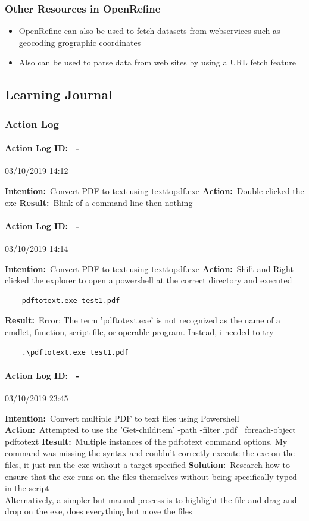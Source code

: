 \documentclass[12pt]{article}
\newcounter{problem} \setcounter{problem}{1}
\newcommand{\actionlog}[1]{\paragraph{Action Log ID: \theproblem\ -}{#1} ~\\ \addtocounter{problem}{1}}
\newcommand{\intention}[1]{\textbf{Intention:}{\textnormal\ #1} \newline}
\newcommand{\action}[1]{\textbf{Action:}{\textnormal\ #1} \newline}
\newcommand{\result}[1]{\textbf{Result:}{\textnormal\ #1} \newline}
\newcommand{\solution}[1]{\textbf{Solution:}{\textnormal\ #1} \newline}
\begin{document}
\subsubsection{Other Resources in OpenRefine}
\begin{itemize}
    \item OpenRefine can also be used to fetch datasets from webservices such as geocoding grographic coordinates
    \item Also can be used to parse data from web sites by using a URL fetch feature
\end{itemize}

\subsection{Learning Journal}

\subsubsection{Action Log}
\actionlog{03/10/2019 14:12}
\intention{Convert PDF to text using texttopdf.exe}
\action{Double-clicked the exe}
\result{Blink of a command line then nothing}

\actionlog{03/10/2019 14:14}
\intention{Convert PDF to text using texttopdf.exe}
\action{Shift and Right clicked the explorer to open a powershell at the correct directory and executed}
\begin{verbatim}
    pdftotext.exe test1.pdf
\end{verbatim}
\result{Error: The term 'pdftotext.exe' is not recognized as the name of a cmdlet, function, script file, or operable program. Instead, i needed to try}
\begin{verbatim}
    .\pdftotext.exe test1.pdf
\end{verbatim}

\actionlog{03/10/2019 23:45}
\intention{Convert multiple PDF to text files using Powershell}
\action{Attempted to use the 'Get-childitem' -path -filter \*.pdf | foreach-object pdftotext}
\result{Multiple instances of the pdftotext command options. My command was missing the syntax and couldn't correctly execute the exe on the files, it just ran the exe without a target specified}
\solution{Research how to ensure that the exe runs on the files themselves without being specifically typed in the script\\
Alternatively, a simpler but manual process is to highlight the file and drag and drop on the exe, does everything but move the files}
\end{document}
